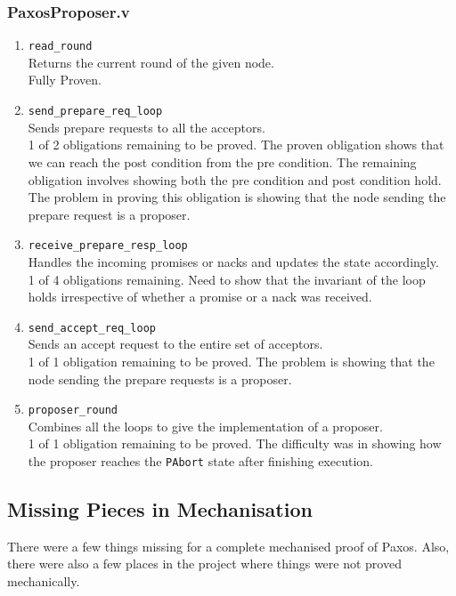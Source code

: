 \subsubsection{PaxosProposer.v}
\begin{enumerate}
  \item \texttt{read\_round} \\
    Returns the current round of the given node. \\
    Fully Proven.
  \item \texttt{send\_prepare\_req\_loop} \\
    Sends prepare requests to all the acceptors. \\
    1 of 2 obligations remaining to be proved. The proven obligation shows that we
    can reach the post condition from the pre condition. The remaining obligation
    involves showing both the pre condition and post condition hold.
    The problem in proving this obligation is showing that the node sending the
    prepare request is a proposer.
  \item \texttt{receive\_prepare\_resp\_loop} \\
    Handles the incoming promises or nacks and updates the state accordingly. \\
    1 of 4 obligations remaining. Need to show that the invariant of the loop holds
    irrespective of whether a promise or a nack was received.
  \item \texttt{send\_accept\_req\_loop} \\
    Sends an accept request to the entire set of acceptors. \\
    1 of 1 obligation remaining to be proved. The problem is showing that
    the node sending the prepare requests is a proposer.
  \item \texttt{proposer\_round} \\
    Combines all the loops to give the implementation of a proposer. \\
    1 of 1 obligation remaining to be proved. The difficulty was in showing how
    the proposer reaches the \texttt{PAbort} state after finishing execution.
\end{enumerate}

\vspace{-5mm}
\subsection{Missing Pieces in Mechanisation}
There were a few things missing for a complete mechanised proof of Paxos.
Also, there were also a few places in the project where things
were not proved mechanically.

